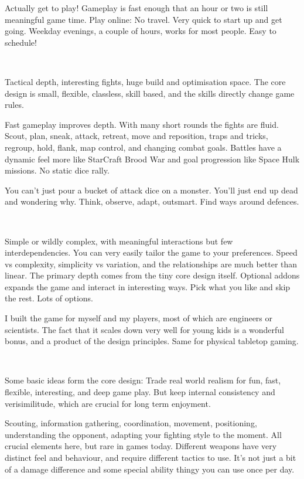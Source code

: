 \noindent
Actually get to play! Gameplay is fast enough that an hour or two is still meaningful game time. Play online: No travel. Very quick to start up and get going. Weekday evenings, a couple of hours, works for most people. Easy to schedule!

\

\noindent
Tactical depth, interesting fights, huge build and optimisation space. The core design is small, flexible, classless, skill based, and the skills directly change game rules.

Fast gameplay improves depth. With many short rounds the fights are fluid. Scout, plan, sneak, attack, retreat, move and reposition, traps and tricks, regroup, hold, flank, map control, and changing combat goals.
Battles have a dynamic feel more like StarCraft Brood War and goal progression like Space Hulk missions. No static dice rally.

You can't just pour a bucket of attack dice on a monster. You'll just end up dead and wondering why. Think, observe, adapt, outsmart. Find ways around defences.

\

\noindent
Simple or wildly complex, with meaningful interactions but few interdependencies. You can very easily tailor the game to your preferences. Speed vs complexity, simplicity vs variation, and the relationships are much better than linear. The primary depth comes from the tiny core design itself. Optional addons expands the game and interact in interesting ways. Pick what you like and skip the rest. Lots of options.

I built the game for myself and my players, most of which are engineers or scientists. The fact that it scales down very well for young kids is a wonderful bonus, and a product of the design principles. Same for physical tabletop gaming.

\

\noindent
Some basic ideas form the core design: Trade real world realism for fun, fast, flexible, interesting, and deep game play. But keep internal consistency and verisimilitude, which are crucial for long term enjoyment.

Scouting, information gathering, coordination, movement, positioning, understanding the opponent, adapting your fighting style to the moment. All crucial elements here, but rare in games today. Different weapons have very distinct feel and behaviour, and require different tactics to use. It's not just a bit of a damage difference and some special ability thingy you can use once per day.





